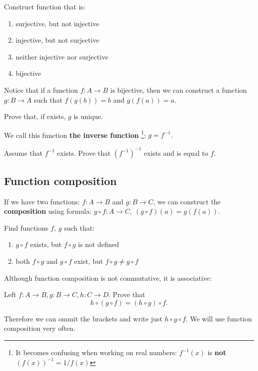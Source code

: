 \begin{prob}
	Construct function that is:
	\begin{enumerate}
		\item surjective, but not injective
		\item injective, but not surjective
		\item neither injective nor surjective
		\item bijective
	\end{enumerate}
\end{prob}

\noindent Notice that if a function $f: A\to B$ is bijective, then we can construct a function $g:B\to A$
such that $f(g(b))=b$ and $g(f(a))=a$.
\begin{prob}
	Prove that, if exists, $g$ is unique.
\end{prob}

\noindent We call this function \textbf{the inverse function}
\footnote{It becomes confusing when working on real numbers: $f^{-1}(x)$ is
\textbf{not} $(f(x))^{-1}=1/f(x)$}: $g=f^{-1}.$

\begin{prob}
	Assume that $f^{-1}$ exists. Prove that $(f^{-1})^{-1}$ exists and is equal to $f$.
\end{prob}

\subsection{Function composition}
If we have two functions: $f:A\to B$ and $g: B\to C$, we can construct the \textbf{composition} using formula:
$g\circ f: A\to C,~(g\circ f)(a) = g(f(a)).$

\begin{prob}
	Find functions $f,~g$ such that:
	\begin{enumerate}
		\item $g\circ f$ exists, but $f\circ g$ is not defined
		\item both $f\circ g$ and $g\circ f$ exist, but $f\circ g\neq g\circ f$
	\end{enumerate}
\end{prob}

\noindent Although function composition is not commutative, it is associative:
\begin{prob}
	Left $f:A\to B, g: B\to C, h: C\to D$. Prove that
	$$h\circ (g\circ f) = (h\circ g)\circ f.$$
\end{prob}
Therefore we can ommit the brackets and write just $h\circ g\circ f.$ We will use function composition very
often.

